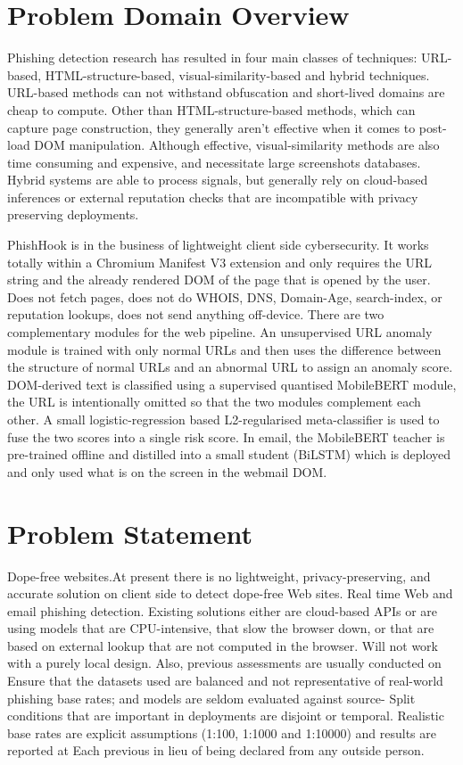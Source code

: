\documentclass{FastFyp}
\begin{document}
\section{Problem Domain Overview}
Phishing detection research has resulted in four main classes of techniques: URL-based, HTML-structure-based, visual-similarity-based and hybrid techniques. URL-based methods can not withstand obfuscation and short-lived domains are cheap to compute. Other than HTML-structure-based methods, which can capture page construction, they generally aren't effective when it comes to post-load DOM manipulation. Although effective, visual-similarity methods are also time consuming and expensive, and necessitate large screenshots databases. Hybrid systems are able to process signals, but generally rely on cloud-based inferences or external reputation checks that are incompatible with privacy preserving deployments.

PhishHook is in the business of lightweight client side cybersecurity. It works totally within a Chromium Manifest V3 extension and only requires the URL string and the already rendered DOM of the page that is opened by the user. Does not fetch pages, does not do WHOIS, DNS, Domain-Age, search-index, or reputation lookups, does not send anything off-device. There are two complementary modules for the web pipeline. An unsupervised URL anomaly module is trained with only normal URLs and then uses the difference between the structure of normal URLs and an abnormal URL to assign an anomaly score. DOM-derived text is classified using a supervised quantised MobileBERT module, the URL is intentionally omitted so that the two modules complement each other. A small logistic-regression based L2-regularised meta-classifier is used to fuse the two scores into a single risk score. In email, the MobileBERT teacher is pre-trained offline and distilled into a small student (BiLSTM) which is deployed and only used what is on the screen in the webmail DOM.

\section{Problem Statement}
\label{sec:problem-statement}
Dope-free websites.At present there is no lightweight, privacy-preserving, and accurate solution on client side to detect dope-free Web sites.
Real time Web and email phishing detection. Existing solutions either are cloud-based APIs or are using
models that are CPU-intensive, that slow the browser down, or that are based on external lookup that are not computed in the browser.
Will not work with a purely local design. Also, previous assessments are usually conducted on
Ensure that the datasets used are balanced and not representative of real-world phishing base rates; and models are seldom evaluated against source-
Split conditions that are important in deployments are disjoint or temporal. Realistic base rates are
explicit assumptions (1:100, 1:1000 and 1:10000) and results are reported at
Each previous in lieu of being declared from any outside person.
\end{document}
